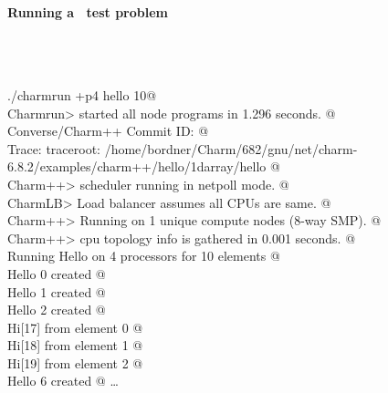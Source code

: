 \begin{frame}[fragile] 
\secframetitle{\ssInstallCharm}
\framesubtitle{Running a \charm\ test problem}
\color{black}
\footnotesize

\prompt{}\\\pause
\prompt{}\\\pause

\color{blue}
\verb@ ./charmrun +p4 hello 10@ \\
\color{black}
\verb@	Charmrun> started all node programs in 1.296 seconds. @ \\
\verb@	Converse/Charm++ Commit ID:  @ \\
\verb@	Trace: traceroot: /home/bordner/Charm/682/gnu/net/charm-6.8.2/examples/charm++/hello/1darray/hello @ \\
\verb@	Charm++> scheduler running in netpoll mode. @ \\
\verb@	CharmLB> Load balancer assumes all CPUs are same. @ \\
\verb@	Charm++> Running on 1 unique compute nodes (8-way SMP). @ \\
\verb@	Charm++> cpu topology info is gathered in 0.001 seconds. @ \\
\verb@	Running Hello on 4 processors for 10 elements @ \\
\verb@	Hello 0 created @ \\
\verb@	Hello 1 created @ \\
\verb@	Hello 2 created @ \\
\verb@	Hi[17] from element 0 @ \\
\verb@	Hi[18] from element 1 @ \\
\verb@	Hi[19] from element 2 @ \\
\verb@	Hello 6 created @ \ldots
\end{frame}

\usebackgroundtemplate
{}

